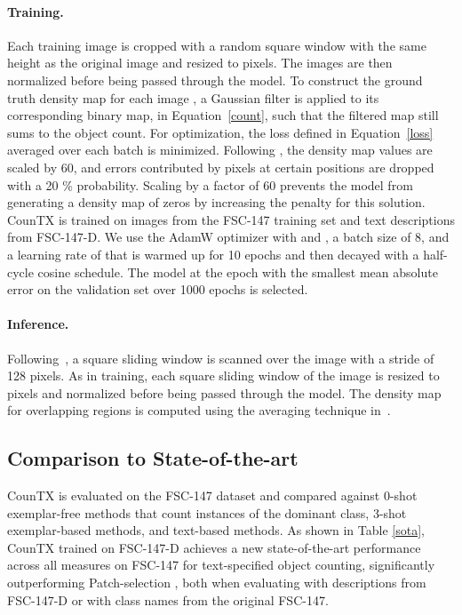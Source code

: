 \documentclass{bmvc2k}
\begin{document}
\paragraph{Training.} Each training image is cropped with a random square window with the same height as the original image and resized to  pixels. The images are then normalized before being passed through the model. To construct the ground truth density map for each image , a Gaussian filter is applied to its corresponding binary map,  in Equation~\ref{count}, such that the filtered map still sums to the object count. For optimization, the loss defined in Equation~\ref{loss} averaged over each batch is minimized. Following \cite{Liu2022CounTRTG}, the density map values are scaled by 60, and errors contributed by pixels at certain positions are dropped with a 20 \% probability. Scaling by a factor of 60 prevents the model from generating a density map of zeros by increasing the penalty for this solution. CounTX is trained on images from the FSC-147 training set and text descriptions from FSC-147-D. We use the AdamW optimizer with  and , a batch size of 8, and a learning rate of  that is warmed up for 10 epochs and then decayed with a half-cycle cosine schedule. The model at the epoch with the smallest mean absolute error on the validation set over 1000 epochs is selected.

\paragraph{Inference.} Following~\cite{Liu2022CounTRTG}, a square sliding window is scanned over the image with a stride of 128 pixels. As in training, each square sliding window of the image is resized to  pixels and normalized before being passed through the model. The density map for overlapping regions is computed using the averaging technique in~\cite{Liu2022CounTRTG}. 

\subsection{Comparison to State-of-the-art}
CounTX is evaluated on the FSC-147 dataset and compared against 0-shot exemplar-free methods that count instances of the dominant class, 3-shot exemplar-based methods, and text-based methods. As shown in Table \ref{sota}, CounTX trained on FSC-147-D achieves a new state-of-the-art performance across all measures on FSC-147 for text-specified object counting, significantly outperforming Patch-selection \cite{Xu2023ZeroshotOC}, both when evaluating with descriptions from FSC-147-D or with class names from the original FSC-147.
\end{document}
